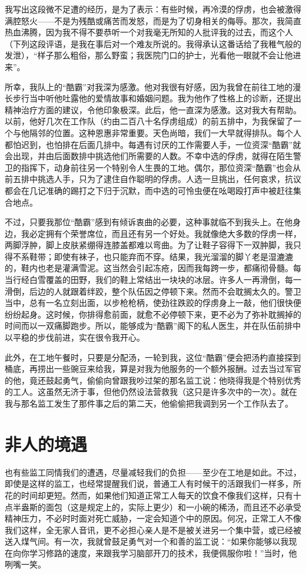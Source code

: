 \documentclass[11pt,oneside]{book}
\begin{document}
\begin{common-format}
我写出这段微不足遭的经历，是为了表示：有些时候，再冷漠的俘虏，也会被激得满腔怒火——不是为残酷或痛苦而发怒，而是为了切身相关的侮辱。那次，我简直热血沸腾，因为我不得不要恭听一个对我毫无所知的人批评我的过去，而这个人（下列这段评语，是我在事后对一个难友所说的。我得承认这番话给了我稚气般的发泄），“样子那么粗俗，那么野蛮；我医院门口的护士，光看他一眼就不会让他进来”。

所幸，我队上的“酷霸”对我深为感激。他对我很有好感，因为我曾在前往工地的漫长步行当中听他吐露他的爱情故事和婚姻问题。我为他作了性格上的诊断，还提出精神治疗方面的建议，令他印象极深。此后，他一直深为感激。这对我大有帮助。以前，他好几次在工作队（约由二百八十名俘虏组成）的前五排中，为我保留了一个与他隔邻的位置。这种恩惠非常重要。天色尚暗，我们一大早就得排队。每个人都怕迟到，也怕排在后面几排中。每遇有讨厌的工作需要人手，一位资深“酷霸”就会出现，并由后面数排中挑选他们所需要的人数。不幸中选的俘虏，就得在陌生警卫的指挥下，动身前往另一个特别令人生畏的工地。偶尔，那位资深“酷霸”也会从前五排中挑选人手，只为了逮住自作聪明的俘虏。人选一旦挑出，任何哀求，抗议都会在几记准确的踢打之下归于沉默，而中选的可怜虫便在吆喝殴打声中被赶往集合地点。

不过，只要我那位“酷霸”感到有倾诉衷曲的必要，这种事就临不到我头上。在他身边，我必定拥有个荣誉席位，而且还有另一个好处。我就像绝大多数的俘虏一样，两脚浮肿，脚上皮肤紧绷得连膝盖都难以弯曲。为了让鞋子容得下一双肿脚，我只得不系鞋带；即使有袜子，也只能弃而不穿。结果，我光溜溜的脚丫老是湿漉漉的，鞋内也老是灌满雪泥。这当然会引起冻疮，因而我每跨一步，都痛彻骨髓。每当行经白雪覆盖的田野，我们的鞋上常结出一块块的冰层。许多人一再滑倒，每一滑倒，后边的人就跟着绊跤，整个队伍因之停顿下来。然而不会耽搁太久的。警卫当中，总有一名立刻出面，以步枪枪柄，使劲往跌跤的俘虏身上一敲，他们很快便纷纷起身。这时候，你排得愈前面，就愈不必停顿下来，更不必为了弥补耽搁掉的时间而以一双痛脚跑步。所以，能够成为“酷霸”阁下的私人医生，并在队伍前排中以平稳的步伐前进，实在很令我开心。

此外，在工地午餐时，只要是分配汤，一轮到我，这位“酷霸”便会把汤杓直接探到桶底，再捞出一些豌豆来给我，算是对我为他服务的一个额外报酬。过去当过军官的他，竟还鼓起勇气，偷偷向曾跟我吵过架的那名监工说：他晓得我是个特别优秀的工人。这虽然无济于事，但他仍然设法营救我（这只是许多次中的一次）。就在我与那名监工发生了那件事之后的第二天，他偷偷把我调到另一个工作队去了。


\section{非人的境遇}
也有些监工同情我们的遭遇，尽量减轻我们的负担——至少在工地是如此。不过，即使是这样的监工，也经常提醒我们说，普通工人有时候干的活跟我们一样多，所花的时间却更短。然而，如果他们知道正常工人每天的饮食不像我们这样，只有十点半盎斯的面包（这是规定上的，实际上更少）和一小碗的稀汤，而且还不必承受精神压力，不必时时面对死亡威胁，一定会知道个中的原因。何况，正常工人不像我们这样，全无家人音讯，更不必担心亲人是不是被关进另一个集中营，或已经被送入煤气间。有一次，我就曾鼓足勇气对一个和善的监工说：“如果你能够以我现在向你学习修路的速度，来跟我学习脑部开刀的技术，我便佩服你啦！”当时，他咧嘴一笑。



\end{common-format}
\end{document}
